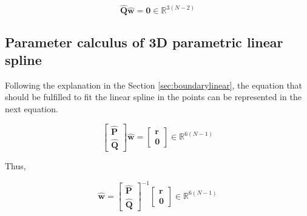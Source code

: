 \begin{equation}
\mathbf{\hat{Q}}
\mathbf{\hat{w}}
=\mathbf{0}\in \mathbb{R}^{3(N-2)}
\end{equation}

\subsection{Parameter calculus of 3D parametric linear spline}
\label{sec:solvelinearspline}
Following the explanation in the Section \ref{sec:boundarylinear},
the equation that should be fulfilled to fit the linear spline in the points can be represented in the next equation.

\begin{equation}
\begin{bmatrix}
\mathbf{\hat{P}}\\
\mathbf{\hat{Q}}
\end{bmatrix}
\mathbf{\hat{w}}
=
\begin{bmatrix}
\mathbf{r}\\
\mathbf{0}
\end{bmatrix}
\in \mathbb{R}^{6(N-1)}
\end{equation}

Thus,

\begin{equation}
\mathbf{\hat{w}}
=
\begin{bmatrix}
\mathbf{\hat{P}}\\
\mathbf{\hat{Q}}
\end{bmatrix}^{-1}
\begin{bmatrix}
\mathbf{r}\\
\mathbf{0}
\end{bmatrix}
\in \mathbb{R}^{6(N-1)}
\end{equation}
